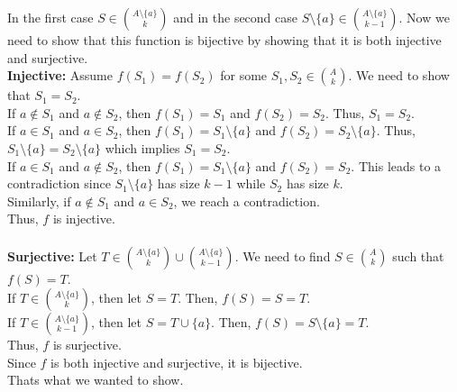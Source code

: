 \documentclass{article}
\begin{document}
In the first case \(S \in \binom{A \setminus \{a\}}{k}\) and in the second case \(S \setminus \{a\} \in \binom{A \setminus \{a\}}{k-1}\). Now we need to show that this function
is bijective by showing that it is both injective and surjective.\\
\textbf{Injective:} Assume \( f(S_1) = f(S_2) \) for some \( S_1, S_2 \in \binom{A}{k} \). We need to show that \( S_1 = S_2 \).\\
If \( a \notin S_1 \) and \( a \notin S_2 \), then \( f(S_1) = S_1 \) and \( f(S_2) = S_2 \). Thus, \( S_1 = S_2 \).\\
If \( a \in S_1 \) and \( a \in S_2 \), then \( f(S_1) = S_1 \setminus \{a\} \) and \( f(S_2) = S_2 \setminus \{a\} \). Thus, \( S_1 \setminus \{a\} = S_2 \setminus \{a\} \) which implies \( S_1 = S_2 \).\\
If \( a \in S_1 \) and \( a \notin S_2 \), then \( f(S_1) = S_1 \setminus \{a\} \) and \( f(S_2) = S_2 \). This leads to a contradiction since \( S_1 \setminus \{a\} \) has size \( k-1 \) while \( S_2 \) has size \( k \).\\
Similarly, if \( a \notin S_1 \) and \( a \in S_2 \), we reach a contradiction.\\
Thus, \( f \) is injective.\\
\\
\textbf{Surjective:} Let \( T \in \binom{A \setminus \{a\}}{k} \cup \binom{A \setminus \{a\}}{k-1} \). We need to find \( S \in \binom{A}{k} \) such that \( f(S) = T \).\\
If \( T \in \binom{A \setminus \{a\}}{k} \), then let \( S = T \). Then, \( f(S) = S = T \).\\
If \( T \in \binom{A \setminus \{a\}}{k-1} \), then let \( S = T \cup \{a\} \). Then, \( f(S) = S \setminus \{a\} = T \).\\
Thus, \( f \) is surjective.\\
Since \( f \) is both injective and surjective, it is bijective.\\
Thats what we wanted to show.
\end{document}

